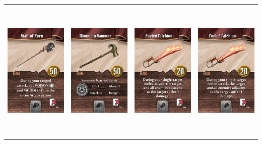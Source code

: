 \documentclass{minimal}
\begin{document}
{\begin{longtable}{llll}
\includegraphics[width=44mm,height=68mm]{./64-151/gh-114-staff-of-xorn.png} &
\includegraphics[width=44mm,height=68mm]{./64-151/gh-115-mountain-hammer.png} &
\includegraphics[width=44mm,height=68mm]{./64-151/gh-116-fueled-falchion.png} &
\includegraphics[width=44mm,height=68mm]{./64-151/gh-116-fueled-falchion.png}\\ 

\end{longtable}}
\end{document}
